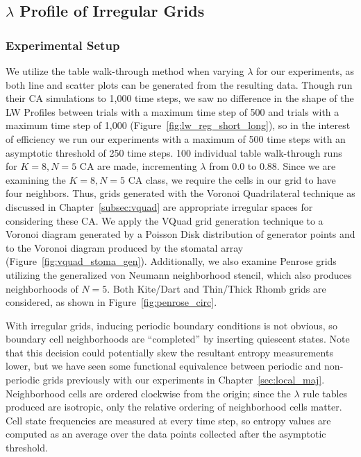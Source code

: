 \documentclass[a4paper,11pt]{article}
\begin{document}
\subsection{$\lambda$ Profile of Irregular Grids}

\subsubsection*{Experimental Setup}

We utilize the table walk-through method when varying $\lambda$ for our experiments, as both line and scatter plots can be generated from the resulting data. Though \citeauthor{wo90} run their CA simulations to 1,000 time steps, we saw no difference in the shape of the LW Profiles between trials with a maximum time step of 500 and trials with a maximum time step of 1,000 (Figure~\ref{fig:lw_reg_short_long}), so in the interest of efficiency we run our experiments with a maximum of 500 time steps with an asymptotic threshold of 250 time steps. 100 individual table walk-through runs for $K=8, N=5$ CA are made, incrementing $\lambda$ from $0.0$ to $0.88$. Since we are examining the $K=8, N=5$ CA class, we require the cells in our grid to have four neighbors. Thus, grids generated with the Voronoi Quadrilateral technique as discussed in Chapter~\ref{subsec:vquad} are appropriate irregular spaces for considering these CA. We apply the VQuad grid generation technique to a Voronoi diagram generated by a Poisson Disk distribution of generator points and to the Voronoi diagram produced by the stomatal array (Figure~\ref{fig:vquad_stoma_gen}). Additionally, we also examine Penrose grids utilizing the generalized von Neumann neighborhood stencil, which also produces neighborhoods of $N=5$. Both Kite/Dart and Thin/Thick Rhomb grids are considered, as shown in Figure~\ref{fig:penrose_circ}.

With irregular grids, inducing periodic boundary conditions is not obvious, so boundary cell neighborhoods are ``completed'' by inserting quiescent states. Note that this decision could potentially skew the resultant entropy measurements lower, but we have seen some functional equivalence between periodic and non-periodic grids previously with our experiments in Chapter~\ref{sec:local_maj}. Neighborhood cells are ordered clockwise from the origin; since the $\lambda$ rule tables produced are isotropic, only the relative ordering of neighborhood cells matter. Cell state frequencies are measured at every time step, so entropy values are computed as an average over the data points collected after the asymptotic threshold.
\end{document}
